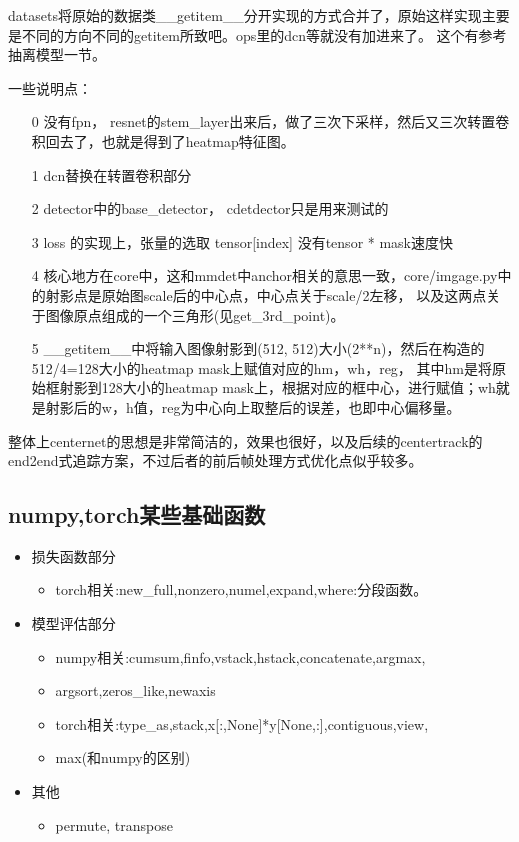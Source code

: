 \documentclass[UTF8]{ctexart}
\begin{document}
datasets将原始的数据类\_\_getitem\_\_分开实现的方式合并了，原始这样实现主要是不同的方向不同的getitem所致吧。ops里的dcn等就没有加进来了。
这个有参考抽离模型一节。

一些说明点：
\begin{itemize}
	\item[0] 没有fpn， resnet的stem\_layer出来后，做了三次下采样，然后又三次转置卷积回去了，也就是得到了heatmap特征图。
	\item[1] dcn替换在转置卷积部分
	\item[2] detector中的base\_detector， cdetdector只是用来测试的
	\item[3] loss 的实现上，张量的选取 tensor[index] 没有tensor * mask速度快
	\item[4] 核心地方在core中，这和mmdet中anchor相关的意思一致，core/imgage.py中的射影点是原始图scale后的中心点，中心点关于scale/2左移，
	以及这两点关于图像原点组成的一个三角形(见get\_3rd\_point)。
	\item[5] \_\_getitem\_\_中将输入图像射影到(512, 512)大小(2**n)，然后在构造的512/4=128大小的heatmap mask上赋值对应的hm，wh，reg，
	其中hm是将原始框射影到128大小的heatmap mask上，根据对应的框中心，进行赋值；wh就是射影后的w，h值，reg为中心向上取整后的误差，也即中心偏移量。
\end{itemize}

整体上centernet的思想是非常简洁的，效果也很好，以及后续的centertrack的end2end式追踪方案，不过后者的前后帧处理方式优化点似乎较多。
\subsection{numpy,torch某些基础函数}
\label{sec:basefunc}

\begin{itemize}
    \item 损失函数部分 \begin{itemize}
        \item torch相关:new\_full,nonzero,numel,expand,where:分段函数。
    \end{itemize}
    \item 模型评估部分 \begin{itemize}
        \item numpy相关:cumsum,finfo,vstack,hstack,concatenate,argmax,
        \item argsort,zeros\_like,newaxis
        \item torch相关:type\_as,stack,x[:,None]*y[None,:],contiguous,view,
        \item max(和numpy的区别)
    \end{itemize}
    \item 其他
    \begin{itemize}
        \item permute, transpose
    \end{itemize}
\end{itemize}
\end{document}
